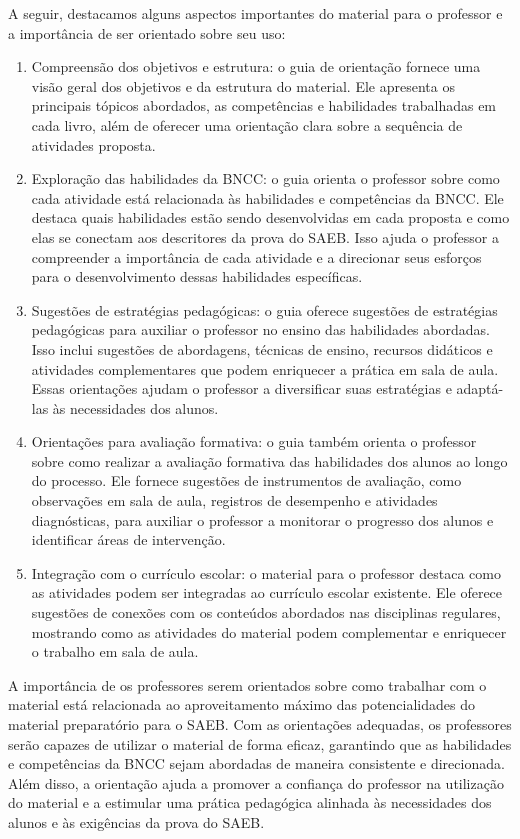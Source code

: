 A seguir, destacamos alguns aspectos importantes do material para o
professor e a importância de ser orientado sobre seu uso:

\begin{enumerate}
\def\labelenumi{\arabic{enumi}.}
\item
  Compreensão dos objetivos e estrutura: o guia de orientação fornece
  uma visão geral dos objetivos e da estrutura do material. Ele
  apresenta os principais tópicos abordados, as competências e
  habilidades trabalhadas em cada livro, além de oferecer uma orientação
  clara sobre a sequência de atividades proposta.
\item
  Exploração das habilidades da BNCC: o guia orienta o professor sobre
  como cada atividade está relacionada às habilidades e competências da
  BNCC. Ele destaca quais habilidades estão sendo desenvolvidas em cada
  proposta e como elas se conectam aos descritores da prova do SAEB.
  Isso ajuda o professor a compreender a importância de cada atividade e
  a direcionar seus esforços para o desenvolvimento dessas habilidades
  específicas.
\item
  Sugestões de estratégias pedagógicas: o guia oferece sugestões de
  estratégias pedagógicas para auxiliar o professor no ensino das
  habilidades abordadas. Isso inclui sugestões de abordagens, técnicas
  de ensino, recursos didáticos e atividades complementares que podem
  enriquecer a prática em sala de aula. Essas orientações ajudam o
  professor a diversificar suas estratégias e adaptá-las às necessidades
  dos alunos.
\item
  Orientações para avaliação formativa: o guia também orienta o
  professor sobre como realizar a avaliação formativa das habilidades
  dos alunos ao longo do processo. Ele fornece sugestões de instrumentos
  de avaliação, como observações em sala de aula, registros de
  desempenho e atividades diagnósticas, para auxiliar o professor a
  monitorar o progresso dos alunos e identificar áreas de intervenção.
\item
  Integração com o currículo escolar: o material para o professor
  destaca como as atividades podem ser integradas ao currículo escolar
  existente. Ele oferece sugestões de conexões com os conteúdos
  abordados nas disciplinas regulares, mostrando como as atividades do
  material podem complementar e enriquecer o trabalho em sala de aula.
\end{enumerate}

A importância de os professores serem orientados sobre como trabalhar
com o material está relacionada ao aproveitamento máximo das
potencialidades do material preparatório para o SAEB. Com as orientações
adequadas, os professores serão capazes de utilizar o material de forma
eficaz, garantindo que as habilidades e competências da BNCC sejam
abordadas de maneira consistente e direcionada. Além disso, a orientação
ajuda a promover a confiança do professor na utilização do material e a
estimular uma prática pedagógica alinhada às necessidades dos alunos e
às exigências da prova do SAEB.

